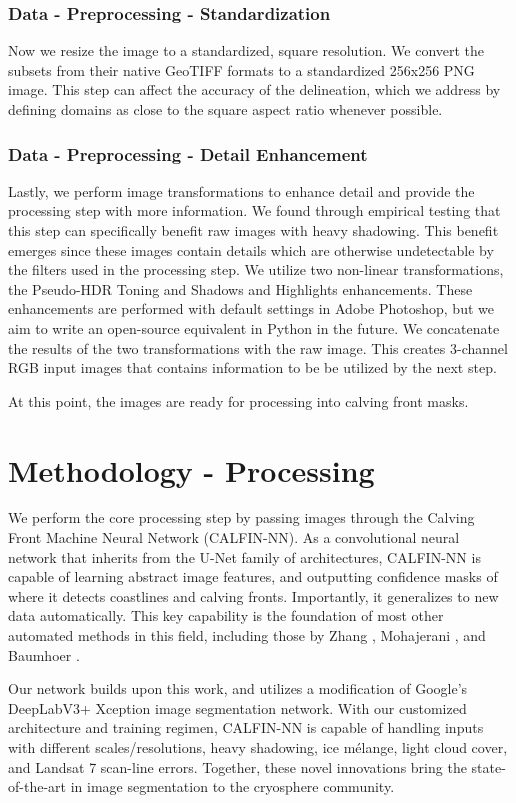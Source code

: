 \documentclass[tc, manuscript]{copernicus}
\begin{document}
\subsubsection{Data - Preprocessing - Standardization}
Now we resize the image to a standardized, square resolution. We convert the subsets from their native GeoTIFF formats to a standardized 256x256 PNG image. This step can affect the accuracy of the delineation, which we address by defining domains as close to the square aspect ratio whenever possible.

\subsubsection{Data - Preprocessing - Detail Enhancement}
Lastly, we perform image transformations to enhance detail and provide the processing step with more information. We found through empirical testing that this step can specifically benefit raw images with heavy shadowing. This benefit emerges since these images contain details which are otherwise undetectable by the filters used in the processing step. We utilize two non-linear transformations, the Pseudo-HDR Toning and Shadows and Highlights enhancements. These enhancements are performed with default settings in Adobe Photoshop, but we aim to write an open-source equivalent in Python in the future. We concatenate the results of the two transformations with the raw image. This creates 3-channel RGB input images that contains information to be be utilized by the next step. 

At this point, the images are ready for processing into calving front masks.


\section{Methodology - Processing}
We perform the core processing step by passing images through the Calving Front Machine Neural Network (CALFIN-NN). As a convolutional neural network that inherits from the U-Net family of architectures, CALFIN-NN is capable of learning abstract image features, and outputting confidence masks of where it detects coastlines  and calving fronts. Importantly, it generalizes to new data automatically. This key capability is the foundation of most other automated methods in this field, including those by Zhang \citep{zhang2019}, Mohajerani \citep{mohajerani2019}, and Baumhoer \citep{baumhoer2019}.

Our network builds upon this work, and utilizes a modification of Google's DeepLabV3+ Xception \citep{chen2018} image segmentation network. With our customized architecture and training regimen, CALFIN-NN is capable of handling inputs with different scales/resolutions, heavy shadowing, ice mélange, light cloud cover, and Landsat 7 scan-line errors. Together, these novel innovations bring the state-of-the-art in image segmentation to the cryosphere community.
\end{document}
